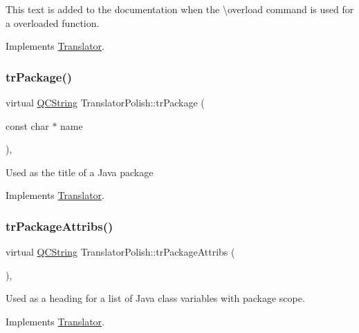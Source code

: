 This text is added to the documentation when the \textbackslash{}overload command is used for a overloaded function. 

Implements \mbox{\hyperlink{class_translator}{Translator}}.

\mbox{\label{class_translator_polish_a90be77db4f73def98c3e2b462c505500}} 
\subsubsection{\texorpdfstring{trPackage()}{trPackage()}}
{\footnotesize\ttfamily virtual \mbox{\hyperlink{class_q_c_string}{Q\+C\+String}} Translator\+Polish\+::tr\+Package (\begin{DoxyParamCaption}\item[{const char $\ast$}]{name }\end{DoxyParamCaption})\hspace{0.3cm}{\ttfamily [inline]}, {\ttfamily [virtual]}}

Used as the title of a Java package 

Implements \mbox{\hyperlink{class_translator}{Translator}}.

\mbox{\label{class_translator_polish_a9d93ff45e31cb1980a348b1ca153db38}} 
\subsubsection{\texorpdfstring{trPackageAttribs()}{trPackageAttribs()}}
{\footnotesize\ttfamily virtual \mbox{\hyperlink{class_q_c_string}{Q\+C\+String}} Translator\+Polish\+::tr\+Package\+Attribs (\begin{DoxyParamCaption}{ }\end{DoxyParamCaption})\hspace{0.3cm}{\ttfamily [inline]}, {\ttfamily [virtual]}}

Used as a heading for a list of Java class variables with package scope. 

Implements \mbox{\hyperlink{class_translator}{Translator}}.

\mbox{\label{class_translator_polish_a2dd2abf2c2de10ab4169db92372d8237}} 
